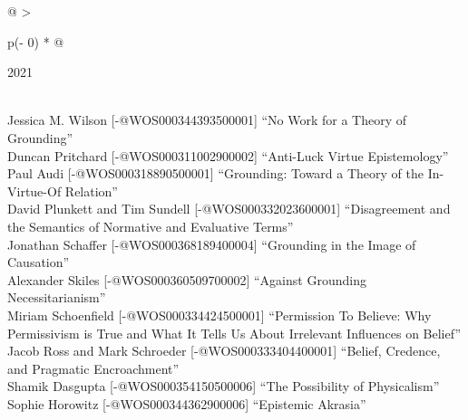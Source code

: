 \documentclass[
  10pt,
  letterpaper,
  DIV=11,
  numbers=noendperiod,
  twoside]{scrartcl}
\begin{document}
\begin{longtable}[]{@{}
  >{\raggedright\arraybackslash}p{(\columnwidth - 0\tabcolsep) * }@{}}

\caption{\label{tbl-top-ten-2012}Most cited articles published less than
ten years ago as of 2021.}

\tabularnewline

\toprule\noalign{}
\begin{minipage}[b]{\linewidth}\raggedright
2021
\end{minipage} \\
\midrule\noalign{}
\endhead
\bottomrule\noalign{}
\endlastfoot
Jessica M. Wilson {[}-@WOS000344393500001{]} ``No Work for a Theory of
Grounding'' \\
Duncan Pritchard {[}-@WOS000311002900002{]} ``Anti-Luck Virtue
Epistemology'' \\
Paul Audi {[}-@WOS000318890500001{]} ``Grounding: Toward a Theory of the
In-Virtue-Of Relation'' \\
David Plunkett and Tim Sundell {[}-@WOS000332023600001{]} ``Disagreement
and the Semantics of Normative and Evaluative Terms'' \\
Jonathan Schaffer {[}-@WOS000368189400004{]} ``Grounding in the Image of
Causation'' \\
Alexander Skiles {[}-@WOS000360509700002{]} ``Against Grounding
Necessitarianism'' \\
Miriam Schoenfield {[}-@WOS000334424500001{]} ``Permission To Believe:
Why Permissivism is True and What It Tells Us About Irrelevant
Influences on Belief'' \\
Jacob Ross and Mark Schroeder {[}-@WOS000333404400001{]} ``Belief,
Credence, and Pragmatic Encroachment'' \\
Shamik Dasgupta {[}-@WOS000354150500006{]} ``The Possibility of
Physicalism'' \\
Sophie Horowitz {[}-@WOS000344362900006{]} ``Epistemic Akrasia'' \\

\end{longtable}
\end{document}
